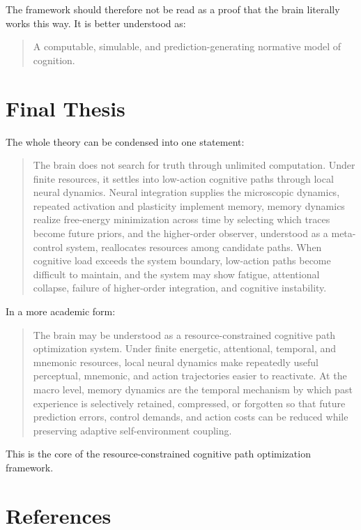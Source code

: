 \documentclass[11pt, a4paper]{article}
\begin{document}
The framework should therefore not be read as a proof that the brain literally works this way. It is better understood as:

\begin{quote}
A computable, simulable, and prediction-generating normative model of cognition.
\end{quote}

\section{Final Thesis}

The whole theory can be condensed into one statement:

\begin{quote}
The brain does not search for truth through unlimited computation. Under finite resources, it settles into low-action cognitive paths through local neural dynamics. Neural integration supplies the microscopic dynamics, repeated activation and plasticity implement memory, memory dynamics realize free-energy minimization across time by selecting which traces become future priors, and the higher-order observer, understood as a meta-control system, reallocates resources among candidate paths. When cognitive load exceeds the system boundary, low-action paths become difficult to maintain, and the system may show fatigue, attentional collapse, failure of higher-order integration, and cognitive instability.
\end{quote}

In a more academic form:

\begin{quote}
The brain may be understood as a resource-constrained cognitive path optimization system. Under finite energetic, attentional, temporal, and mnemonic resources, local neural dynamics make repeatedly useful perceptual, mnemonic, and action trajectories easier to reactivate. At the macro level, memory dynamics are the temporal mechanism by which past experience is selectively retained, compressed, or forgotten so that future prediction errors, control demands, and action costs can be reduced while preserving adaptive self-environment coupling.
\end{quote}

This is the core of the resource-constrained cognitive path optimization framework.

\section*{References}
\end{document}
